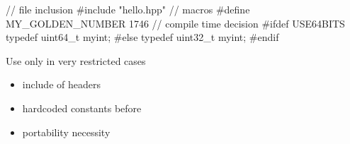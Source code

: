 \begin{frame}[fragile]
  \begin{cppcode}
    // file inclusion
    #include "hello.hpp"
    // macros
    #define MY_GOLDEN_NUMBER 1746
    // compile time decision
    #ifdef USE64BITS
      typedef uint64_t myint;
    #else
      typedef uint32_t myint;
    #endif
  \end{cppcode}
  \pause
  \begin{block}{Use only in very restricted cases}
    \begin{itemize}
    \item include of headers
    \item hardcoded constants before 
    \item portability necessity
    \end{itemize}
  \end{block}
\end{frame}
